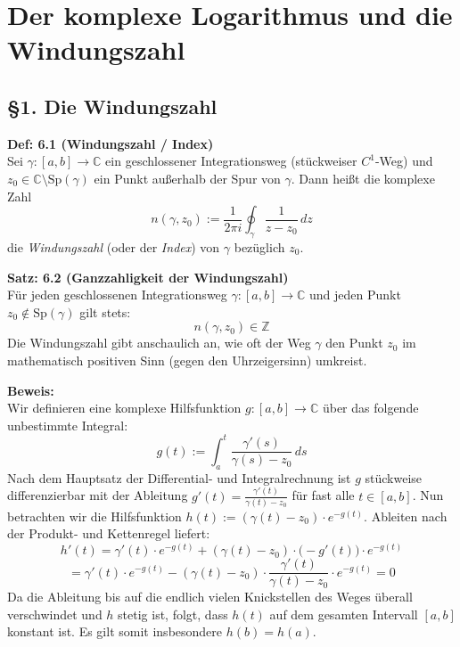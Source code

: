 \section{Der komplexe Logarithmus und die Windungszahl}

\subsection*{\S 1. Die Windungszahl}

\noindent\textbf{Def: 6.1 (Windungszahl / Index)} \\
Sei $\gamma: [a,b] \rightarrow \mathbb{C}$ ein geschlossener Integrationsweg (stückweiser $C^1$-Weg) und $z_0 \in \mathbb{C} \setminus \text{Sp}(\gamma)$ ein Punkt außerhalb der Spur von $\gamma$. Dann heißt die komplexe Zahl
\[
n(\gamma, z_0) := \frac{1}{2\pi i} \oint_{\gamma} \frac{1}{z - z_0} \, dz
\]
die \textit{Windungszahl} (oder der \textit{Index}) von $\gamma$ bezüglich $z_0$.

\vspace{1em}
\noindent\textbf{Satz: 6.2 (Ganzzahligkeit der Windungszahl)} \\
Für jeden geschlossenen Integrationsweg $\gamma: [a,b] \rightarrow \mathbb{C}$ und jeden Punkt $z_0 \notin \text{Sp}(\gamma)$ gilt stets:
\[
n(\gamma, z_0) \in \mathbb{Z}
\]
Die Windungszahl gibt anschaulich an, wie oft der Weg $\gamma$ den Punkt $z_0$ im mathematisch positiven Sinn (gegen den Uhrzeigersinn) umkreist.

\vspace{1em}
\noindent\textbf{Beweis:} \\
Wir definieren eine komplexe Hilfsfunktion $g: [a,b] \rightarrow \mathbb{C}$ über das folgende unbestimmte Integral:
\[
g(t) := \int_{a}^{t} \frac{\gamma'(s)}{\gamma(s) - z_0} \, ds
\]
Nach dem Hauptsatz der Differential- und Integralrechnung ist $g$ stückweise differenzierbar mit der Ableitung $g'(t) = \frac{\gamma'(t)}{\gamma(t) - z_0}$ für fast alle $t \in [a,b]$. Nun betrachten wir die Hilfsfunktion $h(t) := (\gamma(t) - z_0) \cdot e^{-g(t)}$. Ableiten nach der Produkt- und Kettenregel liefert:
\[
h'(t) = \gamma'(t) \cdot e^{-g(t)} + (\gamma(t) - z_0) \cdot \big(-g'(t)\big) \cdot e^{-g(t)}
\]
\[
= \gamma'(t) \cdot e^{-g(t)} - (\gamma(t) - z_0) \cdot \frac{\gamma'(t)}{\gamma(t) - z_0} \cdot e^{-g(t)} = 0
\]
Da die Ableitung bis auf die endlich vielen Knickstellen des Weges überall verschwindet und $h$ stetig ist, folgt, dass $h(t)$ auf dem gesamten Intervall $[a,b]$ konstant ist. Es gilt somit insbesondere $h(b) = h(a)$.

